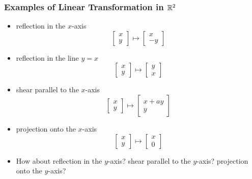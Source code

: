 \documentclass{beamer}
\begin{document}
\begin{frame}
  \frametitle{Examples of Linear Transformation in $\mathbb{R}^2$}


\begin{itemize}
\item reflection in the $x$-axis
\[
\left[
\begin{array}{c}
x \\ y 
\end{array}
\right]
\mapsto
\left[
\begin{array}{c}
x \\ -y 
\end{array}
\right]
\]

\item reflection in the line $y = x$
\[
\left[
\begin{array}{c}
x \\ y 
\end{array}
\right]
\mapsto
\left[
\begin{array}{c}
y \\ x 
\end{array}
\right]
\]

\item shear parallel to the $x$-axis
\[
\left[
\begin{array}{c}
x \\ y 
\end{array}
\right]
\mapsto
\left[
\begin{array}{c}
x+ay \\ y 
\end{array}
\right]
\]

\item projection onto the $x$-axis
\[
\left[
\begin{array}{c}
x \\ y 
\end{array}
\right]
\mapsto
\left[
\begin{array}{c}
x \\ 0 
\end{array}
\right]
\]


\item How about reflection in the $y$-axis? shear parallel to the $y$-axis? projection onto the $y$-axis?

\end{itemize}

\end{frame}
\end{document}
